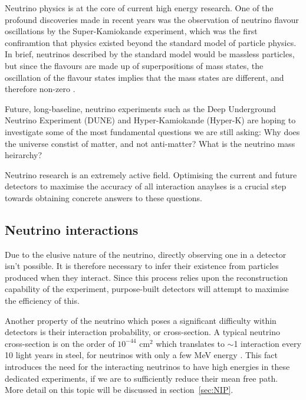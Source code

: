 

Neutrino physics is at the core of current high energy research. One of the profound discoveries made in recent years was the observation of neutrino flavour oscillations by the Super-Kamiokande experiment, which was the first confiramtion that physics existed beyond the standard model of particle physics. In brief, neutrinos described by the standard model would be massless particles, but since the flavours are made up of superpositions of mass states, the oscillation of the flavour states implies that the mass states are different, and therefore non-zero \cite{nuOsc}.

    Future, long-baseline,  neutrino experiments such as the Deep Underground Neutrino Experiment (DUNE) and Hyper-Kamiokande (Hyper-K) are hoping to investigate some of the most fundamental questions we are still asking: Why does the universe constist of matter, and not anti-matter? What is the neutrino mass heirarchy?

    Neutrino research is an extremely active field. Optimising the current and future detectors to maximise the accuracy of all interaction anaylses is a crucial step towards obtaining concrete answers to these questions.

\subsection{Neutrino interactions}

Due to the elusive nature of the neutrino, directly observing one in a detector isn't possible. It is therefore necessary to infer their existence from particles produced when they interact. Since this process relies upon the reconstruction capability of the experiment, purpose-built detectors will attempt to maximise the efficiency of this.

Another property of the neutrino which poses a significant difficulty within detectors is their interaction probability, or cross-section. A typical neutrino cross-section is on the order of $ 10^{-44} $ cm$^{2}$ which translates to $\sim$1 interaction every 10 light years in steel, for neutrinos with only a few MeV energy \cite{nuInt}. This fact introduces the need for the interacting neutrinos to have high energies in these dedicated experiments, if we are to sufficiently
reduce their mean free path. \\  

More detail on this topic will be discussed in section~\ref{sec:NIP}.

